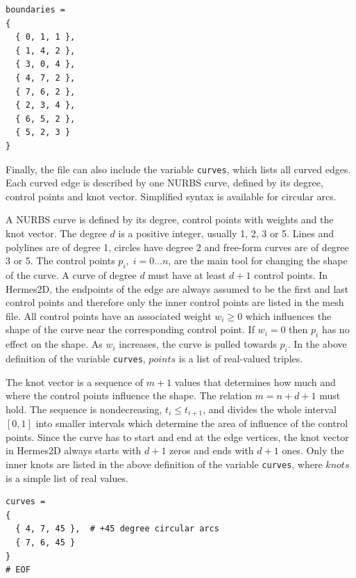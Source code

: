 \documentclass[11pt]{article}
\begin{document}
\begin{lstlisting}
boundaries =
{
  { 0, 1, 1 },
  { 1, 4, 2 },
  { 3, 0, 4 },
  { 4, 7, 2 },
  { 7, 6, 2 },
  { 2, 3, 4 },
  { 6, 5, 2 },
  { 5, 2, 3 }
}
\end{lstlisting}

Finally, the file can also include the variable {\tt curves}, which lists all curved edges.
Each curved edge is described by one NURBS curve, defined by its degree, control points and
knot vector. Simplified syntax is available for circular arcs.

A NURBS curve is defined by its degree, control points with weights and the knot
vector. The degree $d$ is a positive integer, usually 1, 2, 3 or 5. Lines and polylines
are of degree 1, circles have degree 2 and free-form curves are of degree 3 or 5.
The control points $p_i,\; i = 0 \dots n$, are the main tool for changing the shape of
the curve. A curve of degree $d$ must have at least $d+1$ control points. In Hermes2D,
the endpoints of the edge are always assumed to be the first and last control points
and therefore only the inner control points are listed in the mesh file.
All control points have an associated weight $w_i \geq 0$ which influences
the shape of the curve near the corresponding control point.
If $w_i = 0$ then $p_i$ has no effect on the shape.
As $w_i$ increases, the curve is pulled towards $p_i$. In the above definition of
the variable {\tt curves}, $points$ is a list of real-valued triples.

The knot vector is a sequence of $m+1$ values that determines how much and where the
control points influence the shape. The relation $m = n+d+1$ must hold. The sequence is
nondecreasing, $t_i \leq t_{i+1}$, and divides the whole interval $[0,1]$ into smaller
intervals which determine the area of influence of the control points. Since the curve
has to start and end at the edge vertices, the knot vector in Hermes2D always starts
with $d+1$ zeros and ends with $d+1$ ones. Only the inner knots are listed in the
above definition of the variable {\tt curves}, where $knots$ is a simple list of real values.


\begin{lstlisting}
curves =
{
  { 4, 7, 45 },  # +45 degree circular arcs
  { 7, 6, 45 }
}
# EOF
\end{lstlisting}




\end{document}
